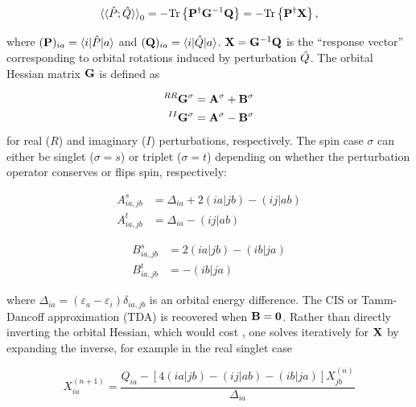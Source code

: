 \begin{equation}
  \braket{\braket{\hat{P}; \hat{Q}}}_{0}
  =
  - {\mathrm{Tr}}\left\{\mathbf{P}^{\dagger} \mathbf{G}^{-1} \mathbf{Q}\right\}
  =
  - {\mathrm{Tr}}\left\{\mathbf{P}^{\dagger} \mathbf{X}\right\},
\end{equation}

where \((\mathbf{P})_{ia} = \braket{i|\hat{P}|a}\) and \((\mathbf{Q})_{ia} = \braket{i|\hat{Q}|a}\). \(\mathbf{X} = \mathbf{G}^{-1} \mathbf{Q}\) is the ``response vector'' corresponding to orbital rotations induced by perturbation \(\hat{Q}\). The orbital Hessian matrix \(\mathbf{G}\) is defined as

\begin{equation}
  \begin{aligned}
    ^{RR}\mathbf{G}^{\sigma} &= \mathbf{A}^{\sigma} + \mathbf{B}^{\sigma} \\
    ^{II}\mathbf{G}^{\sigma} &= \mathbf{A}^{\sigma} - \mathbf{B}^{\sigma}
  \end{aligned}
\end{equation}
for real (\(R\)) and imaginary (\(I\)) perturbations, respectively\cite{doi:10.1080/00268976.2015.1024182}. The spin case \(\sigma\) can either be singlet (\(\sigma = s\)) or triplet (\(\sigma = t\)) depending on whether the perturbation operator conserves or flips spin, respectively:

\begin{equation}
  \begin{aligned}
    A^{s}_{ia,jb} &= \Delta_{ia} + 2(ia|jb) - (ij|ab) \\
    A^{t}_{ia,jb} &= \Delta_{ia} - (ij|ab)
  \end{aligned}
\end{equation}

\begin{equation}
  \begin{aligned}
    B^{s}_{ia,jb} &= 2(ia|jb) - (ib|ja) \\
    B^{t}_{ia,jb} &= - (ib|ja)
  \end{aligned}
\end{equation}

where \(\Delta_{ia} = (\varepsilon_{a} - \varepsilon_{i}) \delta_{ia,jb}\) is an orbital energy difference. The CIS or Tamm-Dancoff approximation (TDA) is recovered when \(\mathbf{B} = \mathbf{0}\). Rather than directly inverting the orbital Hessian, which would cost , one solves iteratively for \(\mathbf{X}\) by expanding the inverse, for example in the real singlet case

\begin{equation}
  \label{eq:update}
  X_{ia}^{(n+1)}
  =
  \frac{Q_{ia} - \left[4(ia|jb) - (ij|ab) - (ib|ja)\right] X_{jb}^{(n)}}
       {\Delta_{ia}}
\end{equation}

